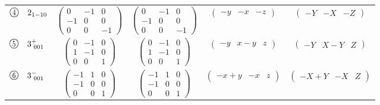 \documentclass[fleqn,10pt,landscape]{jsarticle}
\begin{document}
\begin{center}
\begin{longtable}{lcccc}
$ {\ooalign{\hfil\resizebox{.8\width}{\height}{4}\hfil\crcr\raise.1ex\hbox{\large$\bigcirc$}}}\quad 2{}_{1-10} $ & $ \begin{pmatrix} 0 & -1 & 0 \\ -1 & 0 & 0 \\ 0 & 0 & -1 \end{pmatrix} $ & $ \begin{pmatrix} 0 & -1 & 0 \\ -1 & 0 & 0 \\ 0 & 0 & -1 \end{pmatrix} $ & $ \begin{pmatrix} - y & - x & - z \end{pmatrix} $ & $ \begin{pmatrix} - Y & - X & - Z \end{pmatrix} $ \\
$ {\ooalign{\hfil\resizebox{.8\width}{\height}{5}\hfil\crcr\raise.1ex\hbox{\large$\bigcirc$}}}\quad 3^{+}_{\,\,001} $ & $ \begin{pmatrix} 0 & -1 & 0 \\ 1 & -1 & 0 \\ 0 & 0 & 1 \end{pmatrix} $ & $ \begin{pmatrix} 0 & -1 & 0 \\ 1 & -1 & 0 \\ 0 & 0 & 1 \end{pmatrix} $ & $ \begin{pmatrix} - y & x - y & z \end{pmatrix} $ & $ \begin{pmatrix} - Y & X - Y & Z \end{pmatrix} $ \\
$ {\ooalign{\hfil\resizebox{.8\width}{\height}{6}\hfil\crcr\raise.1ex\hbox{\large$\bigcirc$}}}\quad 3^{-}_{\,\,001} $ & $ \begin{pmatrix} -1 & 1 & 0 \\ -1 & 0 & 0 \\ 0 & 0 & 1 \end{pmatrix} $ & $ \begin{pmatrix} -1 & 1 & 0 \\ -1 & 0 & 0 \\ 0 & 0 & 1 \end{pmatrix} $ & $ \begin{pmatrix} - x + y & - x & z \end{pmatrix} $ & $ \begin{pmatrix} - X + Y & - X & Z \end{pmatrix} $ \\

\end{longtable}
\end{center}
\end{document}

